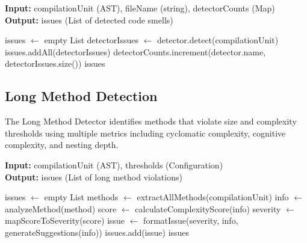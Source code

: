 \documentclass[12pt,a4paper]{article}
\begin{document}
    \begin{algorithm}[H]
        \caption{analyzeFile}
        \textbf{Input:} compilationUnit (AST), fileName (string), detectorCounts (Map)\\
        \textbf{Output:} issues (List of detected code smells)
        \begin{algorithmic}[1]
            \State issues $\gets$ empty List
                    \State detectorIssues $\gets$ detector.detect(compilationUnit)
                        \State issues.addAll(detectorIssues)
                        \State detectorCounts.increment(detector.name, detectorIssues.size())
                    \EndIf
                \EndIf
            \EndFor
            \Return issues
        \end{algorithmic}
    \end{algorithm}

    \subsection{Long Method Detection}

    The Long Method Detector identifies methods that violate size and complexity thresholds using multiple metrics including cyclomatic complexity, cognitive complexity, and nesting depth.

    \begin{algorithm}[H]
        \caption{detectLongMethods}
        \textbf{Input:} compilationUnit (AST), thresholds (Configuration)\\
        \textbf{Output:} issues (List of long method violations)
        \begin{algorithmic}[1]
            \State issues $\gets$ empty List
            \State methods $\gets$ extractAllMethods(compilationUnit)
                \State info $\gets$ analyzeMethod(method)
                    \State score $\gets$ calculateComplexityScore(info)
                    \State severity $\gets$ mapScoreToSeverity(score)
                    \State issue $\gets$ formatIssue(severity, info, generateSuggestions(info))
                    \State issues.add(issue)
                \EndIf
            \EndFor
            \Return issues
        \end{algorithmic}
    \end{algorithm}
\end{document}
